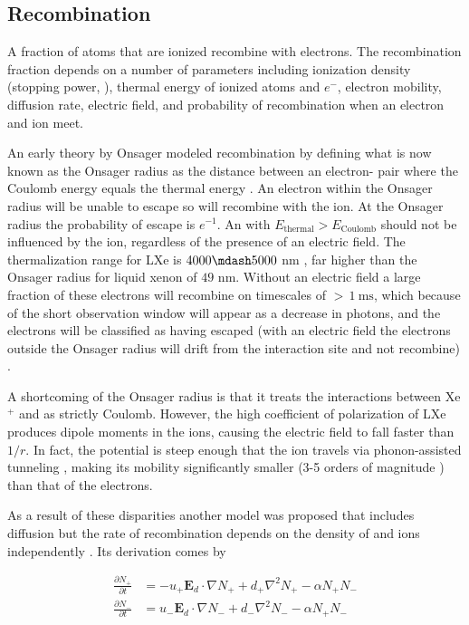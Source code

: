 \subsection{Recombination}
\label{subsec:recombination}
A fraction of atoms that are ionized recombine with electrons.  The recombination fraction depends on a number of parameters
including ionization density
(stopping power, ), thermal energy of ionized atoms and $e^{-}$, electron mobility, diffusion rate, electric
field, and probability of recombination when an electron and ion meet.

An early theory by Onsager modeled recombination by defining what is now known as the Onsager radius as the distance between an
electron- pair where the Coulomb energy equals the \electron thermal energy .  An electron within the
Onsager radius will be unable to escape so will recombine with the ion.  At the Onsager radius the probability of escape is $e^{-1}$.  An
\electron
with $E_{\mathrm{thermal}} > E_{\mathrm{Coulomb}}$ should not be influenced by the ion, regardless of the presence of an electric
field.  The thermalization range for LXe is $4000 \mdash 5000$ nm , far higher than the Onsager radius for liquid
xenon of $49$ nm.  Without an electric field a large fraction of these electrons will recombine on
timescales of ${>}\, 1\ \mathrm{ms}$, which because of the short observation window will appear as a decrease in photons, and the electrons
will be classified as having escaped (with an electric field the electrons outside the Onsager radius will drift from the interaction site
and not recombine) .

A shortcoming of the Onsager radius is that it treats the interactions between Xe$^{+}$ and \electron as strictly Coulomb.  However,
the high coefficient of polarization of LXe produces dipole moments in the ions, causing the electric field to fall faster than
$1/r$.  In fact, the potential is steep enough that the ion travels via phonon-assisted tunneling , making its
mobility significantly smaller (3-5 orders of magnitude ) than that of the electrons.

As a result of these disparities another model was proposed that includes diffusion but the rate of
recombination depends on
the density of \electron and ions independently .  Its derivation comes by

\begin{subequations}
\begin{align}
\frac{\partial N_{+}}{\partial t} &= -u_{+} \mathbf{E}_d \cdot \nabla N_{+} + d_{+} \nabla^{2} N_{+} - \alpha N_{+} N_{-}
\label{eq:diff_plus} \\
\frac{\partial N_{-}}{\partial t} &= u_{-} \mathbf{E}_d \cdot \nabla N_{-} + d_{-} \nabla^{2} N_{-} - \alpha N_{+} N_{-}
\label{eq:diff_minus}
\end{align}
\label{eq:diff_plus_mins}
\end{subequations}

